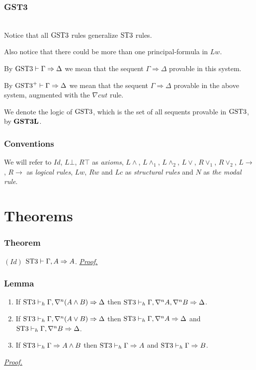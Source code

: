 \documentclass[a4paper, 12pt]{paper}
\begin{document}
\section{GST3} \quad \\



Notice that all $\text{GST3}$ rules generalize $\text{ST3}$ rules.

Also notice that there could be more than one principal-formula in $Lw$.

By $\text{GST3} \vdash \Gamma \Rightarrow \Delta$ we mean that the sequent $\Gamma \Rightarrow \Delta$ provable in this system.

By $\text{GST3}^+ \vdash \Gamma \Rightarrow \Delta$ we mean that the sequent $\Gamma \Rightarrow \Delta$ provable in the above system, augmented with the $\nabla cut$ rule.

We denote the logic of $\text{GST3}$, which is the set of all sequents provable in $\text{GST3}$, by $\mathbf{GST3L}$.


\section{Conventions} We will refer to $Id$, $L \bot$, $R \top$ as \emph{axioms}, $L \wedge$, $L \wedge_1$, $L \wedge_2$, $L \vee$, $R \vee_1$, $R \vee_2$, $L \rightarrow$, $R \rightarrow$ as \emph{logical rules}, $Lw$, $Rw$ and $Lc$ as \emph{structural rules} and $N$ as \emph{the modal rule}.


\pagebreak

\part*{Theorems}
\setcounter{section}{0}


\section{Theorem}\label{thm:stt-id-form} $(Id)$ $\text{ST3} \vdash \Gamma, A \Rightarrow A$. \hyperref[pr:stt-id-form]{\emph{Proof.}}


\section{Lemma}\label{lem:stt-inversion}
\begin{enumerate}
  \item If $\text{ST3} \vdash_h \Gamma, \nabla^n (A \wedge B) \Rightarrow \Delta$ then $\text{ST3} \vdash_h \Gamma, \nabla^n A, \nabla^n B \Rightarrow \Delta$.
  \item If $\text{ST3} \vdash_h \Gamma, \nabla^n (A \vee B) \Rightarrow \Delta$ then $\text{ST3} \vdash_h \Gamma, \nabla^n A \Rightarrow \Delta$ and $\text{ST3} \vdash_h \Gamma, \nabla^n B \Rightarrow \Delta$.
  \item If $\text{ST3} \vdash_h \Gamma \Rightarrow A \wedge B$ then $\text{ST3} \vdash_h \Gamma \Rightarrow A$ and $\text{ST3} \vdash_h \Gamma \Rightarrow B$.
\end{enumerate}
\hyperref[pr:stt-inversion]{\emph{Proof.}}
\end{document}
